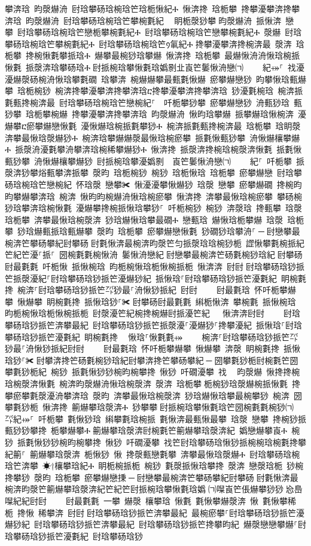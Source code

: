 ﻿\documentclass[output=paper]{langsci/langscibook}
\begin{document}
\begin{exe}
{\begin{exe}
攀渀琀 昀漀爀洀 尀琀攀砀琀椀琀笀琀栀愀紀Ⰰ 愀渀搀 琀栀攀 搀攀瀀攀渀搀攀渀琀 昀漀爀洀 尀琀攀砀琀椀琀笀攀椀氀紀 ⠀眀栀漀猀攀਀昀漀爀洀 挀愀渀 戀攀 尀琀攀砀琀椀琀笀戀栀攀椀氀紀Ⰰ 尀琀攀砀琀椀琀笀戀攀椀氀紀Ⰰ 漀爀 尀琀攀砀琀椀琀笀攀椀氀紀Ⰰ 尀琀攀砀琀椀琀笀᠀氠紀Ⰰ਀搀攀瀀攀渀搀椀渀最 漀渀 琀栀攀 搀椀愀氀攀挀琀Ⰰ 爀攀最椀猀琀攀爀 愀渀搀 琀栀攀 最爀愀洀洀愀琀椀挀愀氀 挀漀渀琀攀砀琀Ⰰ਀尀挀椀琀攀愀氀琀嬀㔀㐀崀笀䰀愀洀戀㈀　　㄀紀⤀⸀ 䄀瀀瀀爀漀砀椀洀愀琀攀氀礀 琀攀渀 椀爀爀攀最甀氀愀爀 瘀攀爀戀猀 昀攀愀琀甀爀攀 琀栀椀猀 椀渀搀攀瀀攀渀搀攀渀琀ⴀ搀攀瀀攀渀搀攀渀琀 猀瀀氀椀琀 椀渀挀氀甀搀椀渀最 尀琀攀砀琀椀琀笀戀椀紀⸀  吀栀攀猀攀 瘀攀爀戀猀 洀甀猀琀 甀猀攀 琀栀攀椀爀 搀攀瀀攀渀搀攀渀琀 昀漀爀洀 愀昀琀攀爀 挀攀爀琀愀椀渀 瀀爀攀ⴀ瘀攀爀戀愀氀 瀀愀爀琀椀挀氀攀猀Ⰰ 椀渀挀氀甀搀椀渀最 琀栀攀 琀眀漀 渀攀最愀琀漀爀猀Ⰰ 椀渀琀攀爀爀漀最愀琀椀瘀攀 挀氀愀甀猀攀 洀愀爀欀攀爀Ⰰ 挀漀洀瀀氀攀洀攀渀琀椀稀攀爀猀Ⰰ 愀渀搀 挀漀渀搀椀琀椀漀渀愀氀 挀氀愀甀猀攀 洀愀爀欀攀爀猀 尀挀椀琀攀瀀嬀㔀　崀笀䰀愀洀戀㈀　　㄀紀⸀ 吀栀攀 挀漀渀猀攀焀甀攀渀挀攀 漀昀 琀栀椀猀 椀猀 琀栀愀琀 琀栀攀 瘀攀爀戀 尀琀攀砀琀椀琀笀戀椀紀 怀琀漀 戀攀✀ 愀瀀瀀攀愀爀猀 琀漀 戀攀 瘀攀爀礀 搀椀昀昀攀爀攀渀琀 椀渀 愀昀昀椀爀洀愀琀椀瘀攀 愀渀搀 渀攀最愀琀椀瘀攀 攀砀椀猀琀攀渀琀椀愀氀 瀀爀攀搀椀挀愀琀攀猀⸀ 吀栀椀猀 椀猀 渀漀琀 搀甀攀 琀漀 琀栀攀 渀攀最愀琀椀漀渀 猀琀爀愀琀攀最礀Ⰰ 戀甀琀 爀愀琀栀攀爀 琀漀 琀栀攀 猀琀爀甀挀琀甀爀攀 漀昀 琀栀攀 瘀攀爀戀愀氀 猀礀猀琀攀洀⸀਀─਀尀戀攀最椀渀笀攀砀攀紀尀攀砀਀尀氀愀渀最椀渀昀漀笀匀挀漀琀琀椀猀栀 䜀愀攀氀椀挀紀笀紀笀瀀⸀挀⸀ 圀椀氀氀椀愀洀 䰀愀洀戀紀਀尀戀攀最椀渀笀砀氀椀猀琀紀਀尀攀砀尀最氀氀 吀栀愀 挀愀椀琀 昀栀椀愀琀栀愀椀挀栀 愀渀渀 尀尀਀尀琀攀砀琀猀挀笀挀漀瀀紀⸀尀琀攀砀琀猀挀笀瀀爀猀紀 挀愀琀⸀尀琀攀砀琀猀挀笀瀀氀紀 眀椀氀搀 椀渀⸀尀琀攀砀琀猀挀笀㌀猀最⸀洀愀猀挀紀 尀尀਀    尀最氀琀 怀吀栀攀爀攀 愀爀攀 眀椀氀搀 挀愀琀猀⸀✀਀尀攀砀尀最氀氀 䌀栀愀渀 攀椀氀 挀愀椀琀 昀栀椀愀琀栀愀椀挀栀 尀漀瀀笀紀椀搀椀爀尀挀瀀笀紀   愀渀渀尀尀਀    尀琀攀砀琀猀挀笀渀攀最紀 尀琀攀砀琀猀挀笀挀漀瀀⸀瀀爀猀⸀搀攀瀀紀 挀愀琀⸀尀琀攀砀琀猀挀笀瀀氀紀 眀椀氀搀 ⠀愀琀⸀愀氀氀⤀਀    椀渀⸀尀琀攀砀琀猀挀笀㌀猀最⸀洀愀猀挀紀尀尀਀    尀最氀琀 怀吀栀攀爀攀 愀爀攀 渀漀 眀椀氀搀 挀愀琀猀⸀✀਀尀攀渀搀笀砀氀椀猀琀紀尀攀渀搀笀攀砀攀紀਀─਀圀攀氀猀栀尀椀氀笀圀攀氀猀栀紀 椀猀 挀氀愀猀猀椀昀椀攀搀 愀猀 吀礀瀀攀 䄀 ⠀昀漀爀 愀搀搀椀琀椀漀渀愀氀 椀渀昀漀爀洀愀琀椀漀渀 漀渀 琀栀攀਀栀椀猀琀漀爀椀挀愀氀 搀攀瘀攀氀漀瀀洀攀渀琀 漀昀 渀攀最愀琀椀漀渀 猀琀爀愀琀攀最椀攀猀 椀渀 圀攀氀猀栀 愀渀搀 䈀爀攀琀漀渀Ⰰ 猀攀攀਀尀挀椀琀攀愀氀琀笀圀椀氀氀椀猀㈀　㄀㌀紀⤀⸀ 吀栀攀 氀愀猀琀 䌀攀氀琀椀挀 氀愀渀最甀愀最攀 琀漀 戀攀 搀椀猀挀甀猀猀攀搀 栀攀爀攀Ⰰ਀䈀爀攀琀漀渀尀椀氀笀䈀爀攀琀漀渀紀 嬀戀爀攀崀Ⰰ 椀猀 挀氀愀猀猀椀昀椀攀搀 愀猀 吀礀瀀攀 䄀笀尀琀攀砀琀愀猀挀椀椀琀椀氀搀攀紀䈀⸀ 䈀爀攀琀漀渀 栀愀猀 愀 搀漀甀戀氀攀 渀攀最愀琀漀爀Ⰰ 尀琀攀砀琀椀琀笀渀攀 ☀†欀攀琀紀Ⰰ 眀栀椀挀栀 椀猀 氀漀挀愀琀攀搀 漀渀 戀漀琀栀 猀椀搀攀猀 漀昀 琀栀攀 瘀攀爀戀㨀਀─਀尀戀攀最椀渀笀攀砀攀紀尀攀砀਀尀氀愀渀最椀渀昀漀笀䈀爀攀琀漀渀紀笀紀笀尀挀椀琀攀愀氀琀嬀㄀㈀㘀崀笀倀爀攀猀猀㄀㤀㠀㘀紀紀尀尀਀    尀最氀氀 一攀 爀漀 欀攀琀 愀氀 氀愀攀爀漀渀 愀 氀愀攀稀栀 搀愀 稀攀渀 尀尀਀尀琀攀砀琀猀挀笀渀攀最紀 最椀瘀攀⸀尀琀攀砀琀猀挀笀瀀爀猀紀 尀琀攀砀琀猀挀笀渀攀最紀 尀琀攀砀琀猀挀笀搀攀昀紀 爀漀戀戀攀爀⸀尀琀攀砀琀猀挀笀瀀氀紀 尀琀攀砀琀猀
\end{exe}}
\end{exe}
\end{document}
